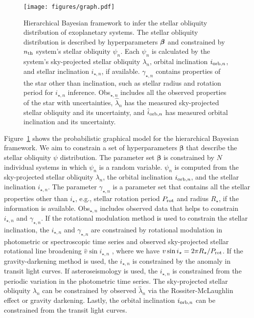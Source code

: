 \documentclass[twocolumn,times]{aastex631}
\begin{document}
\begin{figure}[ht!]
    \texttt{[image: figures/graph.pdf]}
    \caption{Hierarchical Bayesian framework to infer the stellar obliquity distribution of exoplanetary systems. The stellar obliquity distribution is described by hyperparameters $\vb*{\beta}$ and constrained by $n_{\rm th}$ system's stellar obliquity $\psi_n$. Each $\psi_n$ is calculated by the system's sky-projected stellar obliquity $\lambda_n$, orbital inclination $i_{{\rm orb}, n}$, and stellar inclination $i_{\star, n}$, if available. $\gamma_{\star, n}$ contains properties of the star other than inclination, such as stellar radius and rotation period for $i_{\star, n}$ inference. Obs$_{\star,n}$ includes all the observed properties of the star with uncertainties, $\hat{\lambda}_n$ has the measured sky-projected stellar obliquity and its uncertainty, and $\hat{i}_{{\rm orb}, n}$ has measured orbital inclination and its uncertainty.}
    \label{fig:graph}
\end{figure}

Figure~\ref{fig:graph} shows the probabilistic graphical model for the hierarchical Bayesian framework. We aim to constrain a set of hyperparameters $\bm{\beta}$ that describe the stellar obliquity $\psi$ distribution. The parameter set $\bm{\beta}$ is constrained by $N$ individual systems in which $\psi_n$ is a random variable. $\psi_n$ is computed from the sky-projected stellar obliquity $\lambda_n$, the orbital inclination $i_{{\rm orb},n}$, and the stellar inclination $i_{\star, n}$. 
The parameter $\gamma_{\star, n}$ is a parameter set that contains all the stellar properties other than $i_\star$, e.g., stellar rotation period $P_{\rm rot}$ and radius $R_\star$, if the information is available.
Obs$_{\star,n}$ includes observed data that helps to constrain $i_{\star,n}$ and $\gamma_{\star, n}$.
If the rotational modulation method is used to constrain the stellar inclination, the $i_{\star,n}$ and $\gamma_{\star,n}$ are constrained by rotational modulation in photometric or spectroscopic time series and observed sky-projected stellar rotational line broadening $\hat{v}\sin{i_{\star,n}}$ \citep[e.g.,][]{Masuda20}, where we have $v\sin{i_\star} = 2 \pi R_\star / P_{\rm rot}$.
If the gravity-darkening method is used, the $i_{\star,n}$ is constrained by the anomaly in transit light curves. If asteroseismology is used, the $i_{\star,n}$ is constrained from the periodic variation in the photometric time series.
The sky-projected stellar obliquity $\lambda_n$ can be constrained by observed $\hat{\lambda}_n$ via the Rossiter-McLaughlin effect or gravity darkening.
Lastly, the orbital inclination $i_{{\rm orb},n}$ can be constrained from the transit light curves.
\end{document}
